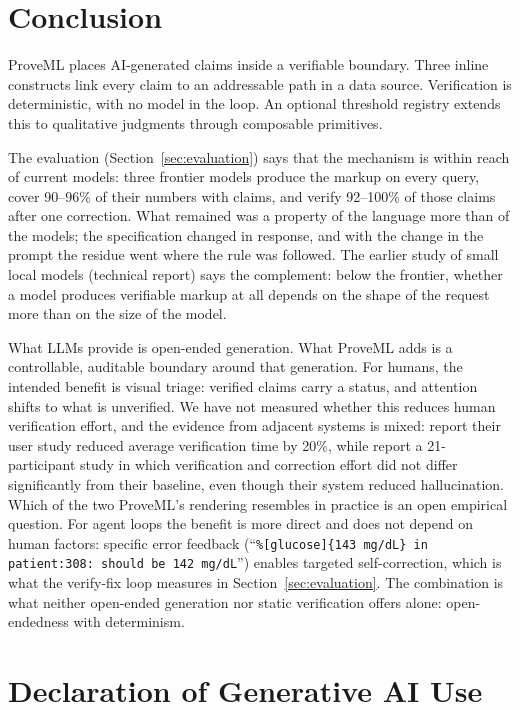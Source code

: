 \documentclass[11pt,a4paper]{article}
\begin{document}
\section{Conclusion}

ProveML places AI-generated claims inside a verifiable boundary. Three inline constructs link every claim to an addressable path in a data source. Verification is deterministic, with no model in the loop. An optional threshold registry extends this to qualitative judgments through composable primitives.

The evaluation (Section~\ref{sec:evaluation}) says that the mechanism is within reach of current models: three frontier models produce the markup on every query, cover 90--96\% of their numbers with claims, and verify 92--100\% of those claims after one correction. What remained was a property of the language more than of the models; the specification changed in response, and with the change in the prompt the residue went where the rule was followed. The earlier study of small local models (technical report) says the complement: below the frontier, whether a model produces verifiable markup at all depends on the shape of the request more than on the size of the model.

What LLMs provide is open-ended generation. What ProveML adds is a controllable, auditable boundary around that generation. For humans, the intended benefit is visual triage: verified claims carry a status, and attention shifts to what is unverified. We have not measured whether this reduces human verification effort, and the evidence from adjacent systems is mixed: \citet{symgen} report their user study reduced average verification time by 20\%, while \citet{ten2026} report a 21-participant study in which verification and correction effort did not differ significantly from their baseline, even though their system reduced hallucination. Which of the two ProveML's rendering resembles in practice is an open empirical question. For agent loops the benefit is more direct and does not depend on human factors: specific error feedback (``\texttt{\%[glucose]\{143 mg/dL\} in patient:308: should be 142 mg/dL}'') enables targeted self-correction, which is what the verify-fix loop measures in Section~\ref{sec:evaluation}. The combination is what neither open-ended generation nor static verification offers alone: open-endedness with determinism.

\section*{Declaration of Generative AI Use}
\end{document}
